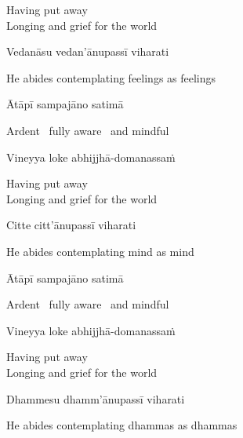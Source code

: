 \begin{english}
  Having put away\\
  Longing and grief for the world\ifdigital\makeatletter\hyperlink{endnote62-appendix}\makeatother\fi
\end{english}

Vedanāsu vedan'ānupassī viharati

\begin{english}
  He abides contemplating feelings as feelings
\end{english}

Ātāpī sampajāno satimā

\begin{english}
  Ardent \breathmark\ fully aware \breathmark\ and mindful
\end{english}

Vineyya loke abhijjhā-domanassaṁ

\begin{english}
  Having put away\\
  Longing and grief for the world
\end{english}

Citte citt'ānupassī viharati

\begin{english}
  He abides contemplating mind as mind
\end{english}

Ātāpī sampajāno satimā

\begin{english}
  Ardent \breathmark\ fully aware \breathmark\ and mindful
\end{english}

\ifninebythirteen\clearpage\fi

Vineyya loke abhijjhā-domanassaṁ

\begin{english}
  Having put away\\
  Longing and grief for the world
\end{english}

Dhammesu dhamm'ānupassī viharati

\begin{english}
  He abides contemplating dhammas as dhammas\ifdigital\makeatletter\hyperlink{endnote63-appendix}\makeatother\fi
\end{english}

